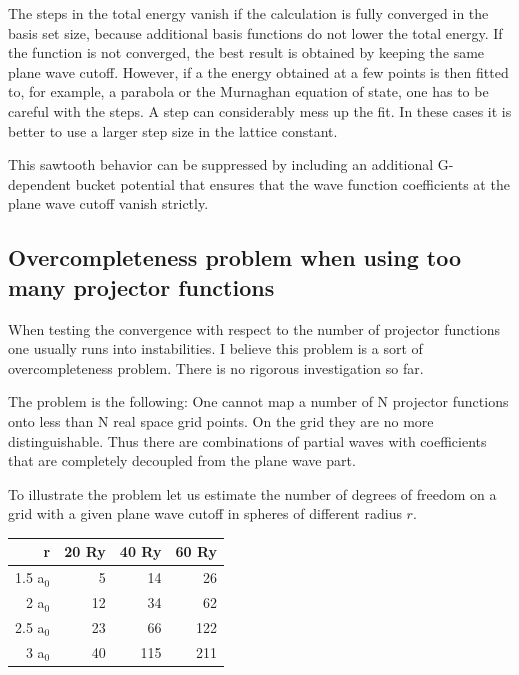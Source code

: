 \documentclass[final,12pt,makeidx,DIV=calc]{article}
\begin{document}
{{{The steps in the total energy vanish if the calculation is fully converged in
the basis set size, because additional basis functions do not lower the total
energy. If the function is not converged, the best result is obtained by
keeping the same plane wave cutoff. However, if a the energy obtained at a few
points is then fitted to, for example, a parabola or the Murnaghan equation of
state\cite{murnaghan44_pnas30_244}, one has to be careful with the steps. A
step can considerably mess up the fit. In these cases it is better to use a
larger step size in the lattice constant.

This sawtooth behavior can be suppressed by including an additional
G-dependent bucket potential that ensures that the wave function
coefficients at the plane wave cutoff vanish strictly.

\subsection{Overcompleteness problem when using too many projector functions}
When testing the convergence with respect to the number of projector
functions one usually runs into instabilities. I believe this problem
is a sort of overcompleteness problem. There is no rigorous
investigation so far.

The problem is the following: One cannot map a number of N projector
functions onto less than N real space grid points. On the grid they
are no more distinguishable. Thus there are combinations of partial
waves with coefficients that are completely decoupled from the plane
wave part. 

To illustrate the problem let us estimate the number of degrees of
freedom on a grid with a given plane wave cutoff in spheres of
different radius $r$.

\begin{center}
\begin{tabular}{|r|r|r|r|}
\hline
r      & 20 Ry & 40 Ry & 60 Ry \\
\hline
1.5 a$_0$ &  5 &  14 &  26 \\
2   a$_0$& 12 &  34 &  62 \\
2.5 a$_0$& 23 &  66 &  122\\
3   a$_0$& 40 & 115 & 211 \\
\hline
\end{tabular}
\end{center}

}}}
\end{document}
